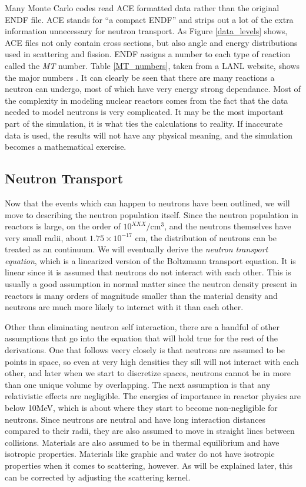 Many Monte Carlo codes read ACE formatted data rather than the original ENDF file.  ACE stands for ``a compact ENDF'' and strips out a lot of the extra information unnecessary for neutron transport.  As Figure \ref{data_levels} shows, ACE files not only contain cross sections, but also angle and energy distributions used in scattering and fission.  ENDF assigns a number to each type of reaction called the \emph{MT} number.  Table \ref{MT_numbers}, taken from a LANL website, shows the major numbers \cite{MTnums}.  It can clearly be seen that there are many reactions a neutron can undergo, most of which have very energy strong dependance.  Most of the complexity in modeling nuclear reactors comes from the fact that the data needed to model neutrons is very complicated.  It may be the most important part of the simulation, it is what ties the calculations to reality.  If inaccurate data is used, the results will not have any physical meaning, and the simulation becomes a mathematical exercise. 

\subsection{Neutron Transport}

Now that the events which can happen to neutrons have been outlined, we will move to describing the neutron population itself.  Since the neutron population in reactors is large, on the order of $10^{XXX}/\mathrm{cm}^3$, and the neutrons themselves have very small radii, about $1.75\times10^{-17}$ cm, the distribution of neutrons can be treated as an continuum.  We will eventually derive the \emph{neutron transport equation}, which is a linearized version of the Boltzmann transport equation.  It is linear since it is assumed that neutrons do not interact with each other.  This is usually a good assumption in normal matter since the neutron density present in reactors is many orders of magnitude smaller than the material density and neutrons are much more likely to interact with it than each other.  

Other than eliminating neutron self interaction, there are a handful of other assumptions that go into the equation that will hold true for the rest of the derivations.  One that follows veery closely is that neutrons are assumed to be points in space, so even at very high densities they sill will not interact with each other, and later when we start to discretize spaces, neutrons cannot be in more than one unique volume by overlapping.  The next assumption is that any relativistic effects are negligible.  The energies of importance in reactor physics are below 10MeV, which is about where they start to become non-negligible for neutrons.  Since neutrons are neutral and have long interaction distances compared to their radii, they are also assumed to move in straight lines between collisions.  Materials are also assumed to be in thermal equilibrium and have isotropic properties.  Materials like graphic and water do not have isotropic properties when it comes to scattering, however.  As will be explained later, this can be corrected by adjusting the scattering kernel.

